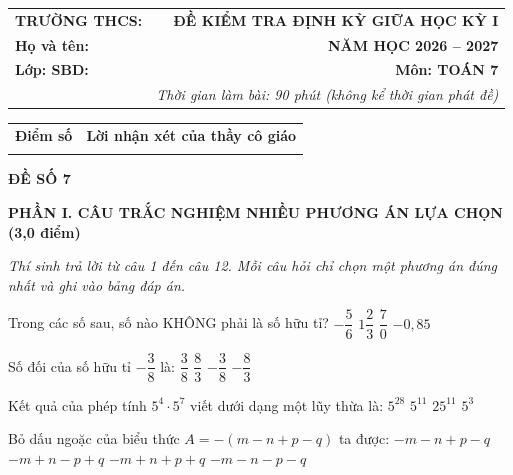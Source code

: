 \documentclass[12pt,a4paper]{article}
\begin{document}
\noindent
\begin{tabularx}{\linewidth}{X r}
\textbf{TRƯỜNG THCS: \dotfill} & \textbf{ĐỀ KIỂM TRA ĐỊNH KỲ GIỮA HỌC KỲ I} \\
\textbf{Họ và tên: \dotfill} & \textbf{NĂM HỌC 2026 -- 2027} \\
\textbf{Lớp: \dotfill \quad SBD: \dotfill} & \textbf{Môn: TOÁN 7} \\
& \textit{Thời gian làm bài: 90 phút (không kể thời gian phát đề)}
\end{tabularx}

\vspace{1.5mm}
\noindent
\begin{tabularx}{\linewidth}{|p{3.5cm}|X|}
\hline
\centering\textbf{Điểm số} & \centering\textbf{Lời nhận xét của thầy cô giáo} \tabularnewline
\rule{0pt}{1.6cm} & \\
\hline
\end{tabularx}

\vspace{2.5mm}
\begin{center}
\textbf{\large ĐỀ SỐ 7}
\end{center}

\noindent\textbf{\large PHẦN I. CÂU TRẮC NGHIỆM NHIỀU PHƯƠNG ÁN LỰA CHỌN (3,0 điểm)}

\textit{Thí sinh trả lời từ câu 1 đến câu 12. Mỗi câu hỏi chỉ chọn một phương án đúng nhất và ghi vào bảng đáp án.}

\vspace{1mm}
\begin{ex}
Trong các số sau, số nào KHÔNG phải là số hữu tỉ?
\choice
{$-\dfrac{5}{6}$}
{$1\dfrac{2}{3}$}
{\True $\dfrac{7}{0}$}
{$-0{,}85$}
\end{ex}

\begin{ex}
Số đối của số hữu tỉ $-\dfrac{3}{8}$ là:
\choice
{\True $\dfrac{3}{8}$}
{$\dfrac{8}{3}$}
{$-\dfrac{3}{8}$}
{$-\dfrac{8}{3}$}
\end{ex}

\begin{ex}
Kết quả của phép tính $5^4 \cdot 5^7$ viết dưới dạng một lũy thừa là:
\choice
{$5^{28}$}
{\True $5^{11}$}
{$25^{11}$}
{$5^3$}
\end{ex}

\begin{ex}
Bỏ dấu ngoặc của biểu thức $A = -(m - n + p - q)$ ta được:
\choice
{$-m - n + p - q$}
{\True $-m + n - p + q$}
{$-m + n + p + q$}
{$-m - n - p - q$}
\end{ex}
\end{document}
